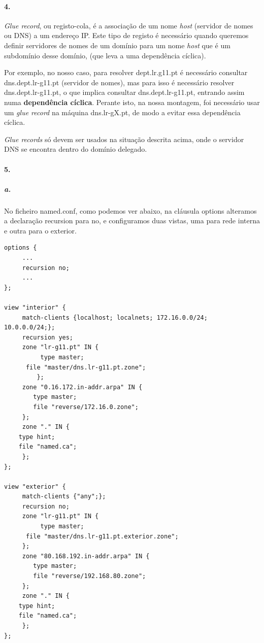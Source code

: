 \paragraph{4.}
\emph{Glue record}, ou registo-cola, é a associação de um nome \emph{host} (servidor de nomes ou DNS) a um endereço IP.
Este tipo de registo é necessário quando queremos definir servidores de nomes de um domínio para um nome \emph{host} que é um subdomínio desse domínio, (que leva a uma dependência cíclica).

Por exemplo, no nosso caso, para resolver \textsf{dept.lr.g11.pt} é necessário consultar \textsf{dns.dept.lr-g11.pt} (servidor de nomes), mas para isso é necessário resolver \textsf{dns.dept.lr-g11.pt}, o que implica consultar \textsf{dns.dept.lr-g11.pt}, entrando assim numa \textbf{dependência cíclica}.
Perante isto, na nossa montagem, foi necessário usar um \emph{glue record} na máquina \textsf{dns.lr-gX.pt}, de modo a evitar essa dependência cíclica.

\emph{Glue records} só devem ser usados na situação descrita acima, onde o servidor DNS se encontra dentro do domínio delegado.


\paragraph{5.}

\subparagraph{a.}
No ficheiro \textsf{named.conf}, como podemos ver abaixo, na cláusula \textsf{options} alteramos a declaração \textsf{recursion} para \textsf{no}, e configuramos duas vistas, uma para rede interna e outra para o exterior.

\begin{verbatim}
options {
     ...
     recursion no;
     ...
};

view "interior" {
     match-clients {localhost; localnets; 172.16.0.0/24; 10.0.0.0/24;};
     recursion yes;
     zone "lr-g11.pt" IN {
     	  type master;
	  file "master/dns.lr-g11.pt.zone";
	     };
     zone "0.16.172.in-addr.arpa" IN {
        type master;
     	file "reverse/172.16.0.zone";
     };
     zone "." IN {
	type hint;
	file "named.ca";
     };
};

view "exterior" {
     match-clients {"any";};
     recursion no;
     zone "lr-g11.pt" IN {
     	  type master;
	  file "master/dns.lr-g11.pt.exterior.zone";
     };
     zone "80.168.192.in-addr.arpa" IN {
        type master;
     	file "reverse/192.168.80.zone";
     };
     zone "." IN {
	type hint;
	file "named.ca";
     };
};
\end{verbatim}

